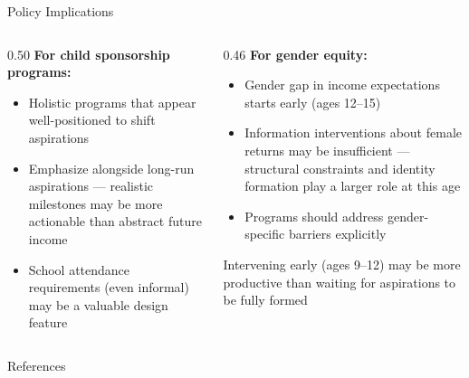 \documentclass[aspectratio=169, 10pt]{beamer}
\begin{document}
\begin{frame}{Policy Implications}
  \begin{columns}
    \begin{column}{0.50\textwidth}
      \textbf{For child sponsorship programs:}
      \begin{itemize}
        \item Holistic programs that  appear well-positioned to shift aspirations
        \item Emphasize  alongside long-run aspirations — realistic milestones may be more actionable than abstract future income
        \item School attendance requirements (even informal) may be a valuable design feature
      \end{itemize}
    \end{column}
    \begin{column}{0.46\textwidth}
      \textbf{For gender equity:}
      \begin{itemize}
        \item Gender gap in income expectations starts early (ages 12--15)
        \item Information interventions about female returns may be insufficient — structural constraints and identity formation play a larger role at this age
        \item Programs should address gender-specific barriers explicitly
      \end{itemize}
      \begin{keybox}
        \small Intervening early (ages 9--12) may be more productive than waiting for aspirations to be fully formed
      \end{keybox}
    \end{column}
  \end{columns}
\end{frame}

\begin{frame}[allowframebreaks]{References}
  \tiny
  
\end{frame}
\end{document}
